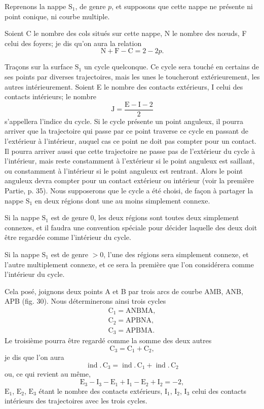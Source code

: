 \documentclass[11pt]{article}
\begin{document}
Reprenons la nappe $\mathrm{S}_1$, de genre $p$, et supposons que cette nappe ne présente ni point conique, ni courbe multiple.

Soient C le nombre des cols situés sur cette nappe, N le nombre des nœuds, F celui des foyers; je dis qu’on aura la relation
\[
\mathrm{N}+\mathrm{F}-\mathrm{C}=2-2p.
\]

Traçons sur la surface $\mathrm{S}_1$ un cycle quelconque. Ce cycle sera touché en certains de ses points par diverses trajectoires, mais les unes le toucheront extérieurement, les autres intérieurement. Soient E le nombre des contacts extérieurs, I celui des contacts intérieurs; le nombre
\[
\mathrm{J}=\frac{\mathrm{E}-\mathrm{I}-2}{2}
\]
s’appellera l’indice du cycle. Si le cycle présente un point anguleux, il pourra arriver que la trajectoire qui passe par ce point traverse ce cycle en passant de l’extérieur à l’intérieur, auquel cas ce point ne doit pas compter pour un contact. Il pourra arriver aussi que cette trajectoire ne passe pas de l’extérieur du cycle à l’intérieur, mais reste constamment à l’extérieur si le point anguleux est saillant, ou constamment à l’intérieur si le point anguleux est rentrant. Alors le point anguleux devra compter pour un contact extérieur ou intérieur (voir la première Partie, p. 35). Nous supposerons que le cycle a été choisi, de façon à partager la nappe $\mathrm{S}_1$ en deux régions dont une au moins simplement connexe.

Si la nappe $\mathrm{S}_1$ est de genre 0, les deux régions sont toutes deux simplement connexes, et il faudra une convention spéciale pour décider laquelle des deux doit être regardée comme l’intérieur du cycle.

Si la nappe $\mathrm{S}_1$ est de genre $>0$, l’une des régions sera simplement connexe, et l’autre multiplement connexe, et ce sera la première que l’on considérera comme l’intérieur du cycle.

Cela posé, joignons deux points A et B par trois arcs de courbe AMB, ANB, APB (fig. 30). Nous déterminerons ainsi trois cycles
\[
\begin{gathered}
\mathrm{C}_1=\mathrm{ANBMA},\\
\mathrm{C}_2=\mathrm{APBNA},\\
\mathrm{C}_3=\mathrm{APBMA}.
\end{gathered}
\]
Le troisième pourra être regardé comme la somme des deux autres
\[
\mathrm{C}_3=\mathrm{C}_1+\mathrm{C}_2,
\]
je dis que l’on aura
\[
\operatorname{ind}.\,\mathrm{C}_3=\operatorname{ind}.\,\mathrm{C}_1+\operatorname{ind}.\,\mathrm{C}_2
\]
ou, ce qui revient au même,
\begin{equation}\tag{1}
\mathrm{E}_3-\mathrm{I}_3-\mathrm{E}_1+\mathrm{I}_1-\mathrm{E}_2+\mathrm{I}_2=-2,
\end{equation}
$\mathrm{E}_1$, $\mathrm{E}_2$, $\mathrm{E}_3$ étant le nombre des contacts extérieurs, $\mathrm{I}_1$, $\mathrm{I}_2$, $\mathrm{I}_3$ celui des contacts intérieurs des trajectoires avec les trois cycles.
\end{document}
